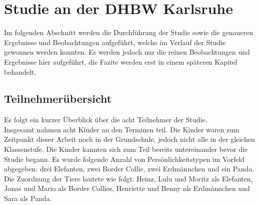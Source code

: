 \chapter{Studie an der DHBW Karlsruhe}
	Im folgenden Abschnitt werden die Durchführung der Studie sowie die genaueren Ergebnisse und Beobachtungen aufgeführt, welche im Verlauf der Studie gewonnen werden konnten. Es werden jedoch nur die reinen Beobachtungen und Ergebnisse hier aufgeführt, die Fazite werden erst in einem späteren Kapitel behandelt.
\section{Teilnehmerübersicht} \label{Teilnehmer}
	Es folgt ein kurzer Überblick über die acht Teilnehmer der Studie.\\
	Insgesamt nahmen acht Kinder an den Terminen teil. Die Kinder waren zum Zeitpunkt dieser Arbeit noch in der Grundschule, jedoch nicht alle in der gleichen Klassenstufe. Die Kinder kannten sich zum Teil bereits untereinander bevor die Studie begann. Es wurde folgende Anzahl von Persönlichkeitstypen im Vorfeld abgegeben: drei Elefanten, zwei Border Collie, zwei Erdmännchen und ein Panda. Die Zuordnung der Tiere lautete wie folgt: Heinz, Lulu und Moritz als Elefanten, Jonas und Mario als Border Collies, Henriette und Benny als Erdmännchen und Sara als Panda.\\
	
